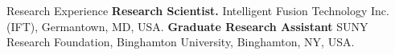 \begin{rubric}{Research Experience}
\entry*[2023 -- Present]%
	\textbf{Research Scientist.} Intelligent Fusion Technology Inc. (IFT), Germantown, MD, USA.
%
%
\entry*[2018 -- 2023]%
	\textbf{Graduate Research Assistant} SUNY Research Foundation, Binghamton University, Binghamton, NY, USA.
%
\end{rubric}